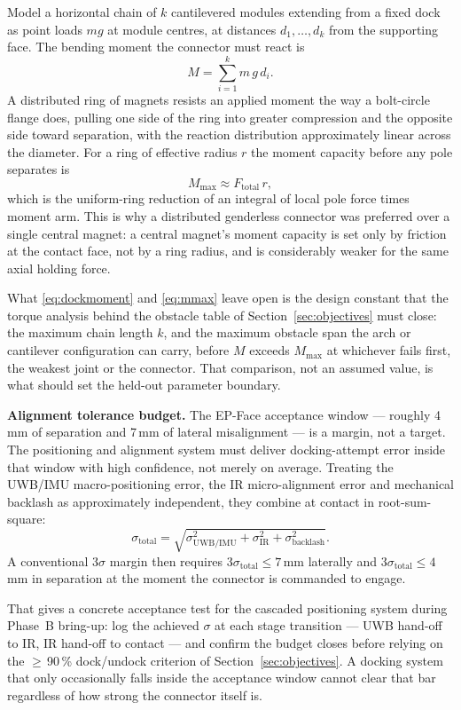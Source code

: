 \documentclass[11pt,a4paper]{article}
\begin{document}
{Model a horizontal chain of $k$ cantilevered modules extending from a fixed
dock as point loads $mg$ at module centres, at distances $d_1,\dots,d_k$ from
the supporting face. The bending moment the connector must react is
\begin{equation}
  M = \sum_{i=1}^{k} m\,g\,d_i .
  \label{eq:dockmoment}
\end{equation}
A distributed ring of magnets resists an applied moment the way a bolt-circle
flange does, pulling one side of the ring into greater compression and the
opposite side toward separation, with the reaction distribution approximately
linear across the diameter. For a ring of effective radius $r$ the moment
capacity before any pole separates is
\begin{equation}
  M_{\max} \approx F_{\text{total}}\, r ,
  \label{eq:mmax}
\end{equation}
which is the uniform-ring reduction of an integral of local pole force times
moment arm. This is why a distributed genderless connector was preferred over a
single central magnet: a central magnet's moment capacity is set only by
friction at the contact face, not by a ring radius, and is considerably weaker
for the same axial holding force.

What \eqref{eq:dockmoment} and \eqref{eq:mmax} leave open is the design
constant that the torque analysis behind the obstacle table of
Section~\ref{sec:objectives} must close: the maximum chain length $k$, and the
maximum obstacle span the arch or cantilever configuration can carry, before
$M$ exceeds $M_{\max}$ at whichever fails first, the weakest joint or the
connector. That comparison, not an assumed value, is what should set the
held-out parameter boundary.

\noindent\textbf{Alignment tolerance budget.} The EP-Face acceptance window ---
roughly 4\,mm of separation and 7\,mm of lateral misalignment \cite{liu2023}
--- is a margin, not a target. The positioning and alignment system must
deliver docking-attempt error inside that window with high confidence, not
merely on average. Treating the UWB/IMU macro-positioning error, the IR
micro-alignment error and mechanical backlash as approximately independent,
they combine at contact in root-sum-square:
\begin{equation}
  \sigma_{\text{total}} = \sqrt{\sigma_{\text{UWB/IMU}}^2
    + \sigma_{\text{IR}}^2 + \sigma_{\text{backlash}}^2}.
  \label{eq:rss}
\end{equation}
A conventional $3\sigma$ margin then requires $3\sigma_{\text{total}} \le
7$\,mm laterally and $3\sigma_{\text{total}} \le 4$\,mm in separation at the
moment the connector is commanded to engage.

That gives a concrete acceptance test for the cascaded positioning system
during Phase~B bring-up: log the achieved $\sigma$ at each stage transition
--- UWB hand-off to IR, IR hand-off to contact --- and confirm the budget
closes before relying on the $\geq$\,90\,\% dock/undock criterion of
Section~\ref{sec:objectives}. A docking system that only occasionally falls
inside the acceptance window cannot clear that bar regardless of how strong the
connector itself is.
}
\end{document}
